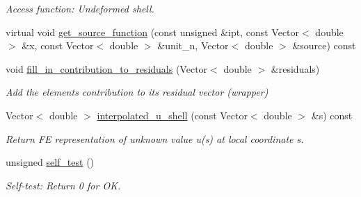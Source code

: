 \begin{DoxyCompactItemize}
\begin{DoxyCompactList}\small\item\em Access function\+: Undeformed shell. \end{DoxyCompactList}\item 
virtual void \hyperlink{classoomph_1_1MyShellEquations_a6c1858131a4ddd0c59a45449db7e182a}{get\+\_\+source\+\_\+function} (const unsigned \&ipt, const Vector$<$ double $>$ \&x, const Vector$<$ double $>$ \&unit\+\_\+n, Vector$<$ double $>$ \&source) const
\item 
void \hyperlink{classoomph_1_1MyShellEquations_ac612ccae94aed8f8ce5b9cc9410f5424}{fill\+\_\+in\+\_\+contribution\+\_\+to\+\_\+residuals} (Vector$<$ double $>$ \&residuals)
\begin{DoxyCompactList}\small\item\em Add the element\textquotesingle{}s contribution to its residual vector (wrapper) \end{DoxyCompactList}\item 
Vector$<$ double $>$ \hyperlink{classoomph_1_1MyShellEquations_a6f170026c39f99db20110a6d6e76e6c0}{interpolated\+\_\+u\+\_\+shell} (const Vector$<$ double $>$ \&s) const
\begin{DoxyCompactList}\small\item\em Return FE representation of unknown value u(s) at local coordinate s. \end{DoxyCompactList}\item 
unsigned \hyperlink{classoomph_1_1MyShellEquations_ab78a1d617fdd782b3e60ffd89e0c4737}{self\+\_\+test} ()
\begin{DoxyCompactList}\small\item\em Self-\/test\+: Return 0 for OK. \end{DoxyCompactList}\end{DoxyCompactItemize}
